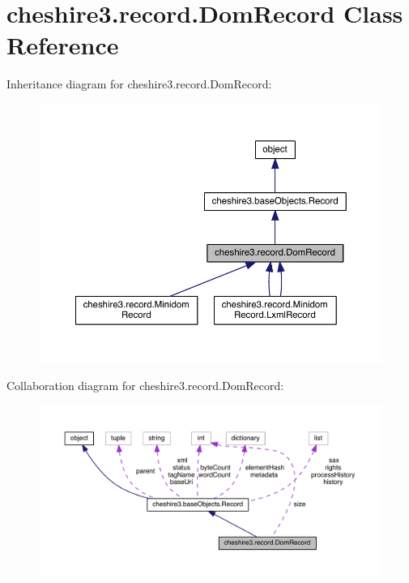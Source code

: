 \hypertarget{classcheshire3_1_1record_1_1_dom_record}{\section{cheshire3.\-record.\-Dom\-Record Class Reference}
\label{classcheshire3_1_1record_1_1_dom_record}
}


Inheritance diagram for cheshire3.\-record.\-Dom\-Record\-:
\nopagebreak
\begin{figure}[H]
\begin{center}
\leavevmode
\includegraphics[width=350pt]{classcheshire3_1_1record_1_1_dom_record__inherit__graph}
\end{center}
\end{figure}


Collaboration diagram for cheshire3.\-record.\-Dom\-Record\-:
\nopagebreak
\begin{figure}[H]
\begin{center}
\leavevmode
\includegraphics[width=350pt]{classcheshire3_1_1record_1_1_dom_record__coll__graph}
\end{center}
\end{figure}
